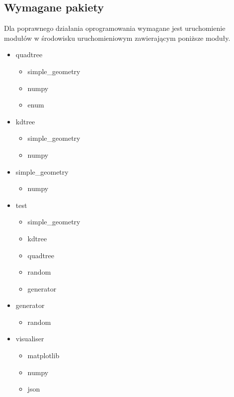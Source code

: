 \documentclass{article}
\begin{document}
        \subsection{Wymagane pakiety}
            Dla poprawnego działania oprogramowania wymagane jest uruchomienie modułów w środowisku uruchomieniowym zawierającym poniższe moduły.
            \begin{multicols}{3}
                \begin{itemize}
                    \item quadtree
                        \begin{itemize}
                            \item simple\_geometry
                            \item numpy
                            \item enum
                        \end{itemize}
                    \item kdtree
                        \begin{itemize}
                            \item simple\_geometry
                            \item numpy
                        \end{itemize}
                    \item simple\_geometry
                        \begin{itemize}
                            \item numpy
                        \end{itemize}
                \columnbreak
                    \item test
                        \begin{itemize}
                            \item simple\_geometry
                            \item kdtree
                            \item quadtree
                            \item random
                            \item generator
                        \end{itemize}
                    \item generator
                        \begin{itemize}
                            \item random
                        \end{itemize}
                    \item visualiser
                        \begin{itemize}
                            \item matplotlib
                            \item numpy
                            \item json
                        \end{itemize}
                    \end{itemize}
            \end{multicols}
            
\end{document}
